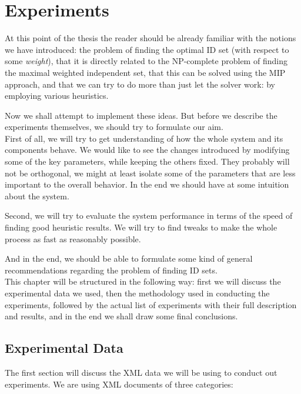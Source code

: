 \chapter{Experiments}


At this point of the thesis the reader should be already familiar with the notions we have introduced: the problem of finding the optimal ID set (with respect to some \textit{weight}), that it is directly related to the NP-complete problem of finding the maximal weighted independent set, that this can be solved using the MIP approach, and that we can try to do more than just let the solver work: by employing various heuristics.

Now we shall attempt to implement these ideas. But before we describe the experiments themselves, we should try to formulate our aim.\\

First of all, we will try to get understanding of how the whole system and its components behave. We would like to see the changes introduced by modifying some of the key parameters, while keeping the others fixed. They probably will not be orthogonal, we might at least isolate some of the parameters that are less important to the overall behavior. In the end we should have at some intuition about the system.

Second, we will try to evaluate the system performance in terms of the speed of finding good heuristic results. We will try to find tweaks to make the whole process as fast as reasonably possible.

And in the end, we should be able to formulate some kind of general recommendations regarding the problem of finding ID sets.\\

This chapter will be structured in the following way: first we will discuss the experimental data we used, then the methodology used in conducting the experiments, followed by the actual list of experiments with their full description and results, and in the end we shall draw some final conclusions.

\section{Experimental Data}

The first section will discuss the XML data we will be using to conduct out experiments. We are using XML documents of three categories:

